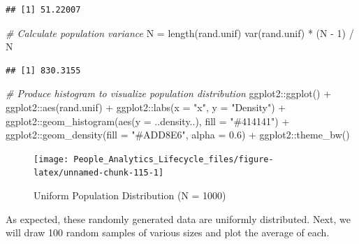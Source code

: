 \documentclass[
]{book}
\newenvironment{Shaded}{\begin{snugshade}}{\end{snugshade}}
\newcommand{\AttributeTok}[1]{\textcolor[rgb]{0.77,0.63,0.00}{#1}}
\newcommand{\CommentTok}[1]{\textcolor[rgb]{0.56,0.35,0.01}{\textit{#1}}}
\newcommand{\DecValTok}[1]{\textcolor[rgb]{0.00,0.00,0.81}{#1}}
\newcommand{\FloatTok}[1]{\textcolor[rgb]{0.00,0.00,0.81}{#1}}
\newcommand{\FunctionTok}[1]{\textcolor[rgb]{0.00,0.00,0.00}{#1}}
\newcommand{\NormalTok}[1]{#1}
\newcommand{\OtherTok}[1]{\textcolor[rgb]{0.56,0.35,0.01}{#1}}
\newcommand{\SpecialCharTok}[1]{\textcolor[rgb]{0.00,0.00,0.00}{#1}}
\newcommand{\StringTok}[1]{\textcolor[rgb]{0.31,0.60,0.02}{#1}}
\begin{document}
\begin{verbatim}
## [1] 51.22007
\end{verbatim}

\begin{Shaded}
\begin{Highlighting}[]
\CommentTok{\# Calculate population variance}
\NormalTok{N }\OtherTok{=} \FunctionTok{length}\NormalTok{(rand.unif)}
\FunctionTok{var}\NormalTok{(rand.unif) }\SpecialCharTok{*}\NormalTok{ (N }\SpecialCharTok{{-}} \DecValTok{1}\NormalTok{) }\SpecialCharTok{/}\NormalTok{ N}
\end{Highlighting}
\end{Shaded}

\begin{verbatim}
## [1] 830.3155
\end{verbatim}

\begin{Shaded}
\begin{Highlighting}[]
\CommentTok{\# Produce histogram to visualize population distribution}
\NormalTok{ggplot2}\SpecialCharTok{::}\FunctionTok{ggplot}\NormalTok{() }\SpecialCharTok{+} 
\NormalTok{ggplot2}\SpecialCharTok{::}\FunctionTok{aes}\NormalTok{(rand.unif) }\SpecialCharTok{+} 
\NormalTok{ggplot2}\SpecialCharTok{::}\FunctionTok{labs}\NormalTok{(}\AttributeTok{x =} \StringTok{"x"}\NormalTok{, }\AttributeTok{y =} \StringTok{"Density"}\NormalTok{) }\SpecialCharTok{+} 
\NormalTok{ggplot2}\SpecialCharTok{::}\FunctionTok{geom\_histogram}\NormalTok{(}\FunctionTok{aes}\NormalTok{(}\AttributeTok{y =}\NormalTok{ ..density..), }\AttributeTok{fill =} \StringTok{"\#414141"}\NormalTok{) }\SpecialCharTok{+}
\NormalTok{ggplot2}\SpecialCharTok{::}\FunctionTok{geom\_density}\NormalTok{(}\AttributeTok{fill =} \StringTok{"\#ADD8E6"}\NormalTok{, }\AttributeTok{alpha =} \FloatTok{0.6}\NormalTok{) }\SpecialCharTok{+}
\NormalTok{ggplot2}\SpecialCharTok{::}\FunctionTok{theme\_bw}\NormalTok{()}
\end{Highlighting}
\end{Shaded}

\begin{figure}

{\centering \texttt{[image: People\_Analytics\_Lifecycle\_files/figure-latex/unnamed-chunk-115-1]} 

}

\caption{Uniform Population Distribution (N = 1000)}\label{fig:unnamed-chunk-115}
\end{figure}

As expected, these randomly generated data are uniformly distributed. Next, we will draw 100 random samples of various sizes and plot the average of each.
\end{document}
